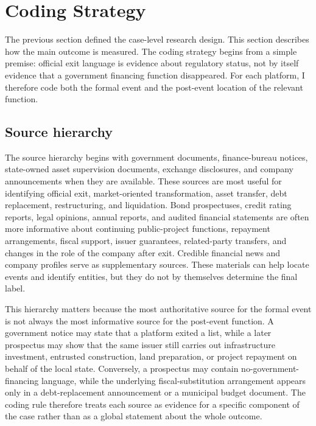 \section{Coding Strategy}

The previous section defined the case-level research design. This section
describes how the main outcome is measured. The coding strategy begins from a
simple premise: official exit language is evidence about regulatory status, not
by itself evidence that a government financing function disappeared. For each
platform, I therefore code both the formal event and the post-event location of
the relevant function.

\subsection{Source hierarchy}

The source hierarchy begins with government documents, finance-bureau notices,
state-owned asset supervision documents, exchange disclosures, and company
announcements when they are available. These sources are most useful for
identifying official exit, market-oriented transformation, asset transfer, debt
replacement, restructuring, and liquidation. Bond prospectuses, credit rating
reports, legal opinions, annual reports, and audited financial statements are
often more informative about continuing public-project functions, repayment
arrangements, fiscal support, issuer guarantees, related-party transfers, and
changes in the role of the company after exit. Credible financial news and
company profiles serve as supplementary sources. These materials can help
locate events and identify entities, but they do not by themselves determine
the final label.

This hierarchy matters because the most authoritative source for the formal
event is not always the most informative source for the post-event function. A
government notice may state that a platform exited a list, while a later
prospectus may show that the same issuer still carries out infrastructure
investment, entrusted construction, land preparation, or project repayment on
behalf of the local state. Conversely, a prospectus may contain
no-government-financing language, while the underlying fiscal-substitution
arrangement appears only in a debt-replacement announcement or a municipal
budget document. The coding rule therefore treats each source as evidence for
a specific component of the case rather than as a global statement about the
whole outcome.

